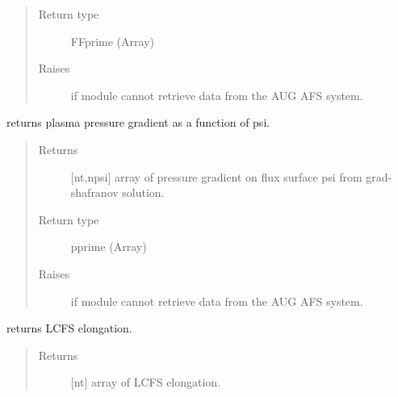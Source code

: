\documentclass[letterpaper,10pt,english]{sphinxmanual}
\begin{document}
\begin{fulllineitems}
\begin{fulllineitems}
\begin{quote}
\begin{description}
\item[{Return type}] \leavevmode
FFprime (Array)

\item[{Raises}] \leavevmode
{} \textendash{} if module cannot retrieve data from the AUG AFS system.

\end{description}\end{quote}

\end{fulllineitems}


\begin{fulllineitems}
\label{\detokenize{eqtools:eqtools.AUGData.AUGDDData.getPPrime}}
returns plasma pressure gradient as a function of psi.
\begin{quote}\begin{description}
\item[{Returns}] \leavevmode
{[}nt,npsi{]} array of pressure gradient on flux surface
psi from grad-shafranov solution.

\item[{Return type}] \leavevmode
pprime (Array)

\item[{Raises}] \leavevmode
{} \textendash{} if module cannot retrieve data from the AUG AFS system.

\end{description}\end{quote}

\end{fulllineitems}


\begin{fulllineitems}
\label{\detokenize{eqtools:eqtools.AUGData.AUGDDData.getElongation}}
returns LCFS elongation.
\begin{quote}\begin{description}
\item[{Returns}] \leavevmode
{[}nt{]} array of LCFS elongation.


\end{description}
\end{quote}
\end{fulllineitems}
\end{fulllineitems}
\end{document}
